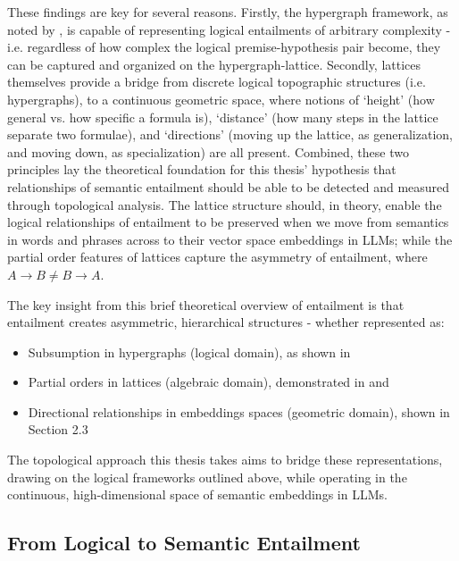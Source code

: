 \documentclass[12pt,twoside]{report}
\begin{document}
These findings are key for several reasons. Firstly, the hypergraph framework, as noted by \cite{leibnizianAnalysis}, is capable of representing logical entailments of arbitrary complexity - i.e. regardless of how complex the logical premise-hypothesis pair become, they can be captured and organized on the hypergraph-lattice. Secondly, lattices themselves provide a bridge from discrete logical topographic structures (i.e. hypergraphs), to a continuous geometric space, where notions of `height' (how general vs. how specific a formula is), `distance' (how many steps in the lattice separate two formulae), and `directions' (moving up the lattice, as generalization, and moving down, as specialization) are all present. Combined, these two principles lay the theoretical foundation for this thesis' hypothesis that relationships of semantic entailment should be able to be detected and measured through topological analysis. The lattice structure should, in theory, enable the logical relationships of entailment to be preserved when we move from semantics in words and phrases across to their vector space embeddings in LLMs; while the partial order features of lattices capture the asymmetry of entailment, where $A \rightarrow B \neq B \rightarrow A$. \newline \par

The key insight from this brief theoretical overview of entailment is that entailment creates asymmetric, hierarchical structures - whether represented as:
\begin{itemize}[itemsep=0pt]
    \item Subsumption in hypergraphs (logical domain), as shown in \cite{leibnizianAnalysis}
    \item Partial orders in lattices (algebraic domain), demonstrated in \cite{Cederquist} and \cite{leibnizianAnalysis}
    \item Directional relationships in embeddings spaces (geometric domain), shown in Section 2.3
\end{itemize}


The topological approach this thesis takes aims to bridge these representations, drawing on the logical frameworks outlined above, while operating in the continuous, high-dimensional space of semantic embeddings in LLMs.


\subsection{From Logical to Semantic Entailment}
\end{document}

